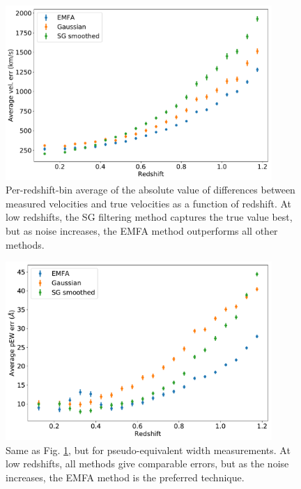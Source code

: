 \begin{figure}[!htb]
    \centering
    \includegraphics[width=0.9\textwidth]{figures/si_feat_pca/wfirst_vel_err.pdf}
    \caption{Per-redshift-bin average of the absolute value of differences between measured velocities and true velocities as a function of redshift. At low redshifts, the SG filtering method captures the true value best, but as noise increases, the EMFA method outperforms all other methods.}
    \label{wfirst_vel_err_vs_z}
\end{figure}

\begin{figure}[!htb]
    \centering
    \includegraphics[width=0.9\textwidth]{figures/si_feat_pca/wfirst_pew_err.pdf}
    \caption{Same as Fig. \ref{wfirst_vel_err_vs_z}, but for pseudo-equivalent width measurements. At low redshifts, all methods give comparable errors, but as the noise increases, the EMFA method is the preferred technique.}
    \label{wfirst_ew_err_vs_z}
\end{figure}

